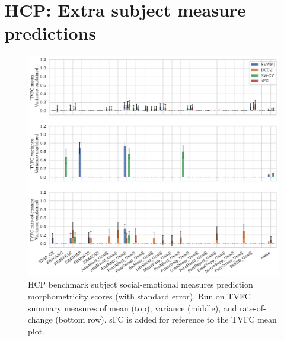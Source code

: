 \clearpage
\section{HCP: Extra subject measure predictions}\label{appendix:hcp-more-results}


\begin{figure}[h]
  \centering
  \includegraphics[width=\textwidth]{fig/hcp/d15/subject_measure_prediction/social-emotional/morphometricity_all_TVFC_summary_measures}
  \caption{
    HCP benchmark subject social-emotional measures prediction morphometricity scores (with standard error).
    Run on TVFC summary measures of mean (top), variance (middle), and rate-of-change (bottom row).
    sFC is added for reference to the TVFC mean plot.
  }\label{fig:results-subject-measures-prediction-social-emotional}
\end{figure}


